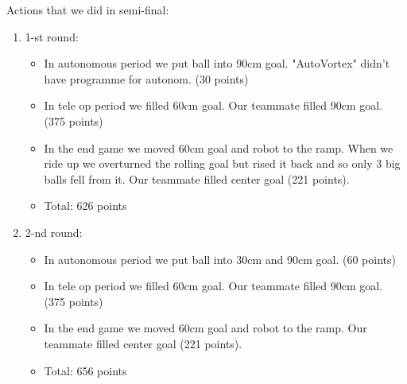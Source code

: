 Actions that we did in semi-final:
\begin{enumerate}
	\item 1-st round:
	\begin{itemize}
		\item In autonomous period we put ball into 90cm goal. "AutoVortex" didn't have programme for autonom. (30 points)
		
		\item In tele op period we filled 60cm goal. Our teammate filled 90cm goal. (375 points)
		
		\item In the end game we moved 60cm goal and robot to the ramp. When we ride up we overturned the rolling goal but rised it back and so only 3 big balls fell from it. Our teammate filled center goal (221 points).
		
		\item Total: 626 points
	\end{itemize}
	\item 2-nd round:
	\begin{itemize}
		\item In autonomous period we put ball into 30cm and 90cm goal. (60 points)
		
		\item In tele op period we filled 60cm goal. Our teammate filled 90cm goal. (375 points)
		
		\item In the end game we moved 60cm goal and robot to the ramp. Our teammate filled center goal (221 points).

		\item Total: 656 points		
	\end{itemize}
\end{enumerate}

